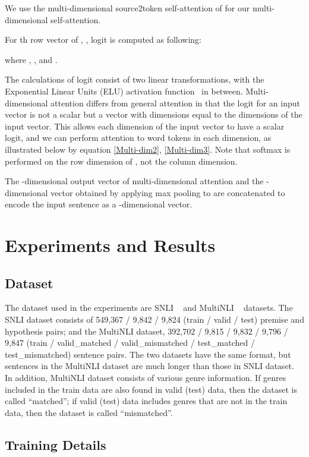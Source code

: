 \documentclass[11pt,letterpaper]{article}
\begin{document}
We use the multi-dimensional source2token self-attention of \citet{DiSAN} for our multi-dimensional self-attention.

For th row vector of , , logit  is computed as following:


where , , and .

The calculations of logit consist of two linear transformations, with the Exponential Linear Units (ELU) activation function~\citep{ELU} in between. Multi-dimensional attention differs from general attention in that the logit for an input vector is not a scalar but a vector with dimensions equal to the dimensions of the input vector. This allows each dimension of the input vector to have a scalar logit, and we can perform attention to  word tokens in each dimension, as illustrated below by equation \ref{Multi-dim2}, \ref{Multi-dim3}. Note that softmax is performed on the row dimension of , not the column dimension.





The -dimensional output vector of multi-dimensional attention and the -dimensional vector obtained by applying max pooling to  are concatenated to encode the input sentence as a -dimensional vector.

\section{Experiments and Results}

\subsection{Dataset}

The dataset used in the experiments are SNLI ~\citep{SNLI} and MultiNLI ~\citep{MultiNLI} datasets. The SNLI dataset consists of 549,367 / 9,842 / 9,824 (train / valid / test) premise and hypothesis pairs; and the MultiNLI dataset, 392,702 / 9,815 / 9,832 / 9,796 / 9,847 (train / valid\_matched / valid\_mismatched / test\_matched / test\_mismatched) sentence pairs. The two datasets have the same format, but sentences in the MultiNLI dataset are much longer than those in SNLI dataset. In addition, MultiNLI dataset consists of various genre information. If genres included in the train data are also found in valid (test) data, then the dataset is called \enquote{matched}; if valid (test) data includes genres that are not in the train data, then the dataset is called \enquote{mismatched}.

\subsection{Training Details}
\end{document}
